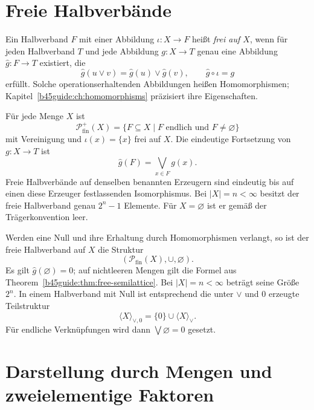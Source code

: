 \section{Freie Halbverbände}

\begin{definition}
\label{b45guide:def:free-semilattice}
Ein Halbverband $F$ mit einer Abbildung $\iota:X\to F$ heißt
\emph{frei auf $X$}, wenn für jeden Halbverband $T$ und jede
Abbildung $g:X\to T$ genau eine Abbildung $\widehat g:F\to T$
existiert, die
\[
 \widehat g(u\vee v)=\widehat g(u)\vee\widehat g(v),
 \qquad \widehat g\circ\iota=g
\]
erfüllt. Solche operationserhaltenden Abbildungen heißen
Homomorphismen; Kapitel~\ref{b45guide:ch:homomorphisms}
präzisiert ihre Eigenschaften.
\end{definition}

\begin{theorem}
\label{b45guide:thm:free-semilattice}
Für jede Menge $X$ ist
\[
 \mathcal P_{\mathrm{fin}}^{+}(X)
  =\{F\subseteq X\mid F\text{ endlich und }F\ne\varnothing\}
\]
mit Vereinigung und $\iota(x)=\{x\}$ frei auf $X$.
Die eindeutige Fortsetzung von $g:X\to T$ ist
\[
 \widehat g(F)=\bigvee_{x\in F}g(x).
\]
Freie Halbverbände auf denselben benannten Erzeugern sind eindeutig
bis auf einen diese Erzeuger festlassenden Isomorphismus.
Bei $|X|=n<\infty$ besitzt der freie Halbverband genau $2^n-1$ Elemente.
Für $X=\varnothing$ ist er gemäß der Trägerkonvention leer. \cite{smith}
\end{theorem}

\begin{theorem}
\label{b45guide:thm:free-zero}
Werden eine Null und ihre Erhaltung durch Homomorphismen verlangt,
so ist der freie Halbverband auf $X$ die Struktur
\[
 (\mathcal P_{\mathrm{fin}}(X),\cup,\varnothing).
\]
Es gilt $\widehat g(\varnothing)=0$; auf nichtleeren Mengen gilt
die Formel aus Theorem~\ref{b45guide:thm:free-semilattice}.
Bei $|X|=n<\infty$ beträgt seine Größe $2^n$.
In einem Halbverband mit Null ist entsprechend die unter
$\vee$ und $0$ erzeugte Teilstruktur
\[
 \langle X\rangle_{\vee,0}
   =\{0\}\cup\langle X\rangle_{\vee}.
\]
Für endliche Verknüpfungen wird dann $\bigvee\varnothing=0$ gesetzt.
\cite{smith}
\end{theorem}

\section{Darstellung durch Mengen und zweielementige Faktoren}

